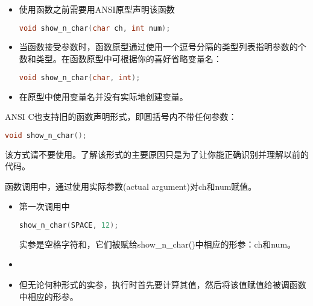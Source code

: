 \begin{frame}[fragile]
\begin{itemize}
\item
使用函数之前需要用ANSI原型声明该函数
\begin{lstlisting}[language=c,backgroundcolor=\color{red!10}]
void show_n_char(char ch, int num);
\end{lstlisting}
\vspace{0.1in}

\item
当函数接受参数时，函数原型通过使用一个逗号分隔的类型列表指明参数的个数和类型。在函数原型中可根据你的喜好省略变量名：
\begin{lstlisting}[language=c,backgroundcolor=\color{red!10}]
void show_n_char(char, int);
\end{lstlisting}
\vspace{0.1in}

\item
在原型中使用变量名并没有实际地创建变量。
\end{itemize}

\end{frame}

\begin{frame}[fragile]
ANSI C也支持旧的函数声明形式，即圆括号内不带任何参数：
\begin{lstlisting}[language=c,backgroundcolor=\color{red!10}]
void show_n_char();
\end{lstlisting}
该方式请不要使用。了解该形式的主要原因只是为了让你能正确识别并理解以前的代码。
\end{frame}

\begin{frame}[fragile]
函数调用中，通过使用实际参数{\tf (actual argument)}对{\tf ch}和{\tf num}赋值。
\begin{itemize}
\item
第一次调用中
\begin{lstlisting}[language=c,backgroundcolor=\color{red!10}]
show_n_char(SPACE, 12);
\end{lstlisting}
实参是空格字符和{}，它们被赋给{\tf show\_n\_char()}中相应的形参：{\tf ch}和{\tf num}。\\[0.1in]
\item {}\\[0.1in]
\item 但无论何种形式的实参，执行时首先要计算其值，然后将该值赋值给被调函数中相应的形参。
\end{itemize}
\end{frame}

